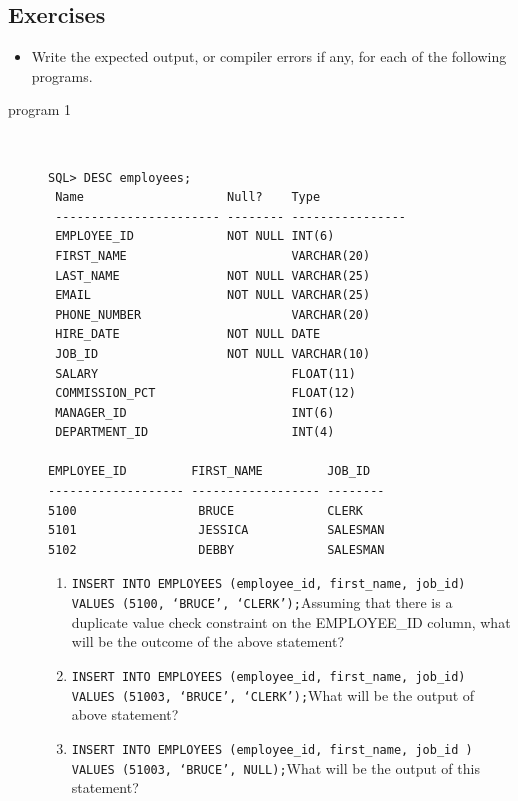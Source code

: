\documentclass[11pt,a4paper]{article}
\def\AnswerBox{\fbox{\begin{minipage}{4in}\hfill\vspace{0.5in}\end{minipage}}}
\begin{document}
\subsection*{Exercises}
\begin{itemize}
\item Write the expected output, or compiler errors if any, for each of the following programs.
\end{itemize}
\begin{description}
\item[program 1]\
\begin{verbatim}
SQL> DESC employees;
 Name                    Null?    Type
 ----------------------- -------- ----------------
 EMPLOYEE_ID             NOT NULL INT(6)
 FIRST_NAME                       VARCHAR(20)
 LAST_NAME               NOT NULL VARCHAR(25)
 EMAIL                   NOT NULL VARCHAR(25)
 PHONE_NUMBER                     VARCHAR(20)
 HIRE_DATE               NOT NULL DATE
 JOB_ID                  NOT NULL VARCHAR(10)
 SALARY                           FLOAT(11)
 COMMISSION_PCT                   FLOAT(12)
 MANAGER_ID                       INT(6)
 DEPARTMENT_ID                    INT(4)

EMPLOYEE_ID         FIRST_NAME         JOB_ID 
------------------- ------------------ --------
5100                 BRUCE             CLERK
5101                 JESSICA           SALESMAN
5102                 DEBBY             SALESMAN
\end{verbatim}

\AnswerBox

\begin{enumerate}[label=\bfseries Q\arabic*:]\itemsep10pt
\item \texttt{INSERT INTO EMPLOYEES (employee\_id, first\_name, job\_id) VALUES (5100, `BRUCE', `CLERK');}\newline Assuming that there is a duplicate value check constraint on the EMPLOYEE\_ID column, what will be the outcome of the above statement?
\item \texttt{INSERT INTO EMPLOYEES (employee\_id, first\_name, job\_id) VALUES (51003, `BRUCE', `CLERK');}\newline What will be the output of above statement?
\item \texttt{INSERT INTO EMPLOYEES (employee\_id, first\_name, job\_id ) VALUES (51003, `BRUCE', NULL);}\newline What will be the output of this statement?
\end{enumerate}


\end{description}
\end{document}
